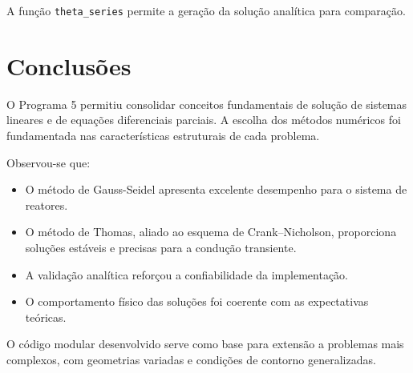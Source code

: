 \documentclass[12pt]{article}
\begin{document}
A função \texttt{theta\_series} permite a geração da solução analítica para comparação.

\section{Conclusões}

O Programa 5 permitiu consolidar conceitos fundamentais de solução de sistemas lineares e de equações diferenciais parciais. A escolha dos métodos numéricos foi fundamentada nas características estruturais de cada problema.

Observou-se que:
\begin{itemize}
    \item O método de Gauss-Seidel apresenta excelente desempenho para o sistema de reatores.
    \item O método de Thomas, aliado ao esquema de Crank–Nicholson, proporciona soluções estáveis e precisas para a condução transiente.
    \item A validação analítica reforçou a confiabilidade da implementação.
    \item O comportamento físico das soluções foi coerente com as expectativas teóricas.
\end{itemize}

O código modular desenvolvido serve como base para extensão a problemas mais complexos, com geometrias variadas e condições de contorno generalizadas.
\end{document}
